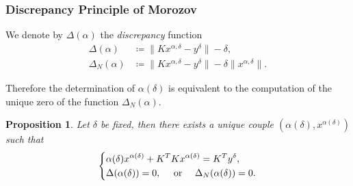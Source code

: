 \documentclass[10pt,xcolor={dvipsnames}]{beamer}
\newtheorem{proposition}[subsection]{Proposition}
\theoremstyle{plain}
\theoremstyle{plain}
\begin{document}
\begin{frame}
 \frametitle{Discrepancy Principle of Morozov}
 \begin{definition}
 We denote by $\Delta(\alpha)$ the \emph{discrepancy} function
 \begin{align}
  \Delta(\alpha)&\coloneqq\|Kx^{\alpha,\delta} - y^\delta\| - \delta, \label{eq:def-disc}\\
  \Delta_N(\alpha)&\coloneqq\|Kx^{\alpha,\delta} - y^\delta\| - \delta\|x^{\alpha,\delta}\|.\label{eq:def-disc-N}
 \end{align}
\end{definition}
Therefore the determination of $\alpha(\delta)$ is equivalent to the computation 
of the unique zero of the function $\Delta_N(\alpha)$.
\begin{proposition}
\label{prop:strategy-disc}
 Let $\delta$ be fixed, then there exists a unique 
 couple $(\alpha(\delta), x^{\alpha(\delta)})$ such that
 \begin{equation}
  \left\{
  \begin{split}
   & \alpha(\delta) x^{\alpha(\delta)} + K^TKx^{\alpha(\delta)} = K^Ty^\delta, \\
   & \Delta(\alpha(\delta))=0, \quad\textup{ or }\quad \Delta_N(\alpha(\delta))=0.
  \end{split}
  \right.
 \end{equation}
\end{proposition}
\end{frame}
\end{document}

